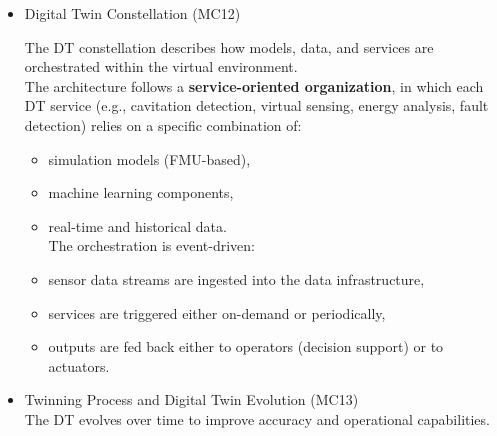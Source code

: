 \documentclass[
]{article}
\providecommand{\tightlist}{%
  \setlength{\itemsep}{0pt}\setlength{\parskip}{0pt}}
\begin{document}
\begin{itemize}
\begin{itemize}
\begin{itemize}
\begin{itemize}
\begin{itemize}
          \begin{itemize}
          \tightlist
          \item
            Azure IoT Hub and Event Hub for data ingestion and
            streaming,
          \item
            Azure Functions for event-driven computation,
          \item
            Data Lake for storage,
          \item
            OPC UA server for communication.
          \end{itemize}
        \item
          \textbf{Application layer:}

          Web application interface for visualization and interaction.\\
          These enablers collectively ensure data acquisition, model
          execution, orchestration, and user interaction.
        \end{itemize}
      \item
        Digital Twin Constellation (MC12)

        The DT constellation describes how models, data, and services
        are orchestrated within the virtual environment.\\
        The architecture follows a \textbf{service-oriented
        organization}, in which each DT service (e.g., cavitation
        detection, virtual sensing, energy analysis, fault detection)
        relies on a specific combination of:

        \begin{itemize}
        \tightlist
        \item
          simulation models (FMU-based),
        \item
          machine learning components,
        \item
          real-time and historical data.\\
          The orchestration is event-driven:
        \item
          sensor data streams are ingested into the data infrastructure,
        \item
          services are triggered either on-demand or periodically,
        \item
          outputs are fed back either to operators (decision support) or
          to actuators.
        \end{itemize}
      \item
        Twinning Process and Digital Twin Evolution (MC13)\\
        The DT evolves over time to improve accuracy and operational
        capabilities.


\end{itemize}
\end{itemize}
\end{itemize}
\end{itemize}
\end{document}
